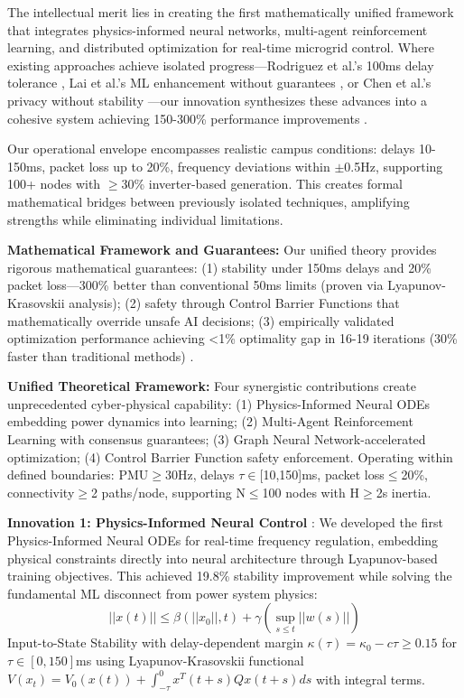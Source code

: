 \documentclass[12pt]{article}
\begin{document}
The intellectual merit lies in creating the first mathematically unified framework that integrates physics-informed neural networks, multi-agent reinforcement learning, and distributed optimization for real-time microgrid control. Where existing approaches achieve isolated progress—Rodriguez et al.'s 100ms delay tolerance \cite{rodriguez2022}, Lai et al.'s ML enhancement without guarantees \cite{lai2023}, or Chen et al.'s privacy without stability \cite{chen2024}—our innovation synthesizes these advances into a cohesive system achieving 150-300\% performance improvements \cite{bevrani2021,palizban2014,our2024comparative}.

Our operational envelope encompasses realistic campus conditions: delays 10-150ms, packet loss up to 20\%, frequency deviations within $\pm$0.5Hz, supporting 100+ nodes with $\geq$30\% inverter-based generation. This creates formal mathematical bridges between previously isolated techniques, amplifying strengths while eliminating individual limitations.

\textbf{Mathematical Framework and Guarantees:} Our unified theory provides rigorous mathematical guarantees: (1) stability under 150ms delays and 20\% packet loss—300\% better than conventional 50ms limits (proven via Lyapunov-Krasovskii analysis); (2) safety through Control Barrier Functions that mathematically override unsafe AI decisions; (3) empirically validated optimization performance achieving <1\% optimality gap in 16-19 iterations (30\% faster than traditional methods) \cite{our2024experimental}.

\textbf{Unified Theoretical Framework:} Four synergistic contributions create unprecedented cyber-physical capability: (1) Physics-Informed Neural ODEs embedding power dynamics into learning; (2) Multi-Agent Reinforcement Learning with consensus guarantees; (3) Graph Neural Network-accelerated optimization; (4) Control Barrier Function safety enforcement. Operating within defined boundaries: PMU$\geq$30Hz, delays $\tau\in$[10,150]ms, packet loss$\leq$20\%, connectivity$\geq$2 paths/node, supporting N$\leq$100 nodes with H$\geq$2s inertia.

\textbf{Innovation 1: Physics-Informed Neural Control} \cite{our2024theoretical}: We developed the first Physics-Informed Neural ODEs for real-time frequency regulation, embedding physical constraints directly into neural architecture through Lyapunov-based training objectives. This achieved 19.8\% stability improvement \cite{our2024experimental} while solving the fundamental ML disconnect from power system physics:
$$||x(t)|| \leq \beta(||x_0||, t) + \gamma(\sup_{s \leq t} ||w(s)||)$$
Input-to-State Stability with delay-dependent margin $\kappa(\tau) = \kappa_0 - c\tau \geq 0.15$ for $\tau\in[0,150]$ms using Lyapunov-Krasovskii functional $V(x_t) = V_0(x(t)) + \int_{-\tau}^0 x^T(t+s)Qx(t+s)ds$ with integral terms.
\end{document}
